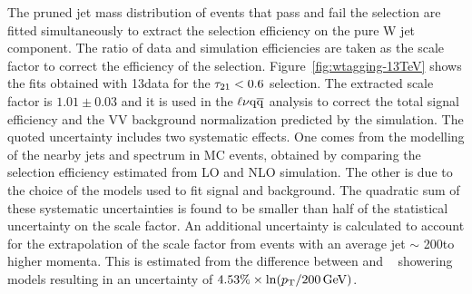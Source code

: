 The pruned jet mass distribution of events that pass and fail the \nsubj selection are fitted simultaneously to extract the selection efficiency on the pure W jet component. The ratio of data and simulation efficiencies are taken as the scale factor to correct the efficiency of the \nsubj selection. Figure~\ref{fig:wtagging-13TeV} shows the fits obtained with 13\TeV data for the $\tau_{21} < 0.6$ selection. 
The extracted scale factor is $1.01 \pm 0.03$ and it is used in the $\ell\nu\mathrm{q}\overline{\mathrm{q}}$ analysis to correct the total signal efficiency and the VV background normalization predicted by the simulation.
The quoted uncertainty includes two systematic effects. One comes from the modelling of the nearby jets and \pt spectrum in \ttbar MC events, obtained by comparing the selection efficiency estimated from LO and NLO \ttbar simulation. %
The other is due to the choice of the models used to fit signal and background.
The quadratic sum of these systematic uncertainties is found to be smaller than half of the statistical uncertainty on the scale factor. An additional uncertainty is calculated to account for the extrapolation of the scale factor from \ttbar events with an average jet \pt $\sim$ 200\GeV to higher momenta. This is estimated from the difference between  and \HERWIG{++}~\cite{Bahr:2008pv} showering models resulting in an uncertainty of $4.53\% \times \displaystyle \ln(p_{\mathrm{T}}/200\,\text{Ge\hspace{-.08em}V})$.

